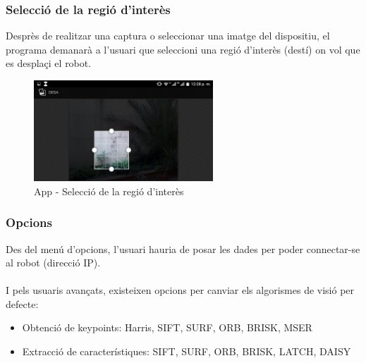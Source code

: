 	\subsubsection{Selecció de la regió d'interès}
		Desprès de realitzar una captura o seleccionar una imatge del dispositiu, el programa demanarà a l'usuari que seleccioni una regió d'interès (destí) on vol que es desplaçi el robot.
		\begin{figure}[H]
			\centering
			\includegraphics[width=0.6\textwidth]{images/crop}
			\caption{App - Selecció de la regió d'interès}
		\end{figure}
	\subsubsection{Opcions}
		Des del menú d'opcions, l'usuari hauria de posar les dades per poder connectar-se al robot (direcció IP).\\\\
		I pels usuaris avançats, existeixen opcions per canviar els algorismes de visió per defecte:\\
		\begin{itemize}
			\item{Obtenció de keypoints: Harris, SIFT, SURF, ORB, BRISK, MSER}
			\item{Extracció de característiques: SIFT, SURF, ORB, BRISK, LATCH, DAISY\\}
		\end{itemize}
